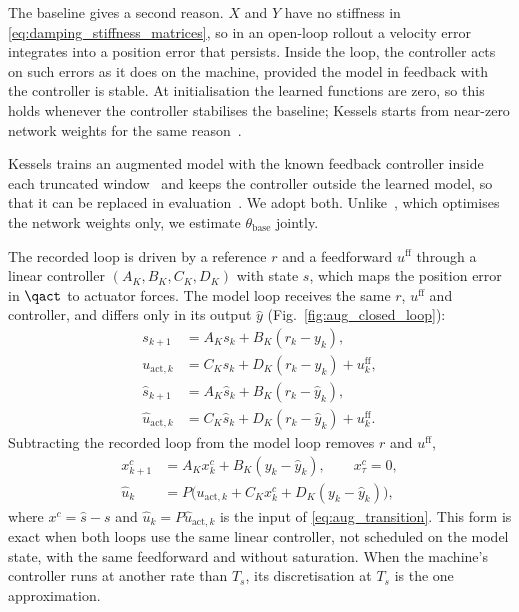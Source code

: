 The baseline gives a second reason.
$X$ and $Y$ have no stiffness in \eqref{eq:damping_stiffness_matrices}, so
in an open-loop rollout a velocity error integrates into a position error
that persists.
Inside the loop, the controller acts on such errors as it does on the
machine, provided the model in feedback with the controller is stable.
At initialisation the learned functions are zero, so this holds whenever
the controller stabilises the baseline; Kessels starts from near-zero
network weights for the same reason~\cite[Sec.~5.2.3]{kessels2025ai}.

Kessels trains an augmented model with the known feedback controller inside
each truncated window~\cite[Eqs.~(5.12), (5.13c), (5.13d)]{kessels2025ai}
and keeps the controller outside the learned model, so that it can be
replaced in evaluation~\cite[Sec.~5.3.2.3]{kessels2025ai}.
We adopt both.
Unlike~\cite[Eq.~(5.12)]{kessels2025ai}, which optimises the network
weights only, we estimate $\theta_{\mathrm{base}}$ jointly.

The recorded loop is driven by a reference $r$ and a feedforward
$u^{\mathrm{ff}}$ through a linear controller $(A_K,B_K,C_K,D_K)$ with
state $s$, which maps the position error in $\qact$ to actuator forces.
The model loop receives the same $r$, $u^{\mathrm{ff}}$ and controller, and
differs only in its output $\hat y$ (Fig.~\ref{fig:aug_closed_loop}):
\begin{equation}
\begin{aligned}
 s_{k+1}&=A_K s_k+B_K(r_k-y_k), \\
 u_{\mathrm{act},k}&=C_K s_k+D_K(r_k-y_k)+u^{\mathrm{ff}}_k,\\
 \hat s_{k+1}&=A_K \hat s_k+B_K(r_k-\hat y_k), \\
 \hat u_{\mathrm{act},k}&=C_K \hat s_k+D_K(r_k-\hat y_k)+u^{\mathrm{ff}}_k .
\end{aligned}
\label{eq:aug_direct_controller}
\end{equation}
Subtracting the recorded loop from the model loop removes $r$ and
$u^{\mathrm{ff}}$,
\begin{equation}
\begin{aligned}
 x^c_{k+1}&=A_K x^c_k+B_K(y_k-\hat y_k),\qquad x^c_\tau=0,\\
 \hat u_k&=P\bigl(u_{\mathrm{act},k}+C_K x^c_k+D_K(y_k-\hat y_k)\bigr),
\end{aligned}
\label{eq:aug_controller}
\end{equation}
where $x^c=\hat s-s$ and $\hat u_k=P\hat u_{\mathrm{act},k}$ is the input
of \eqref{eq:aug_transition}.
This form is exact when both loops use the same linear controller, not
scheduled on the model state, with the same feedforward and without
saturation.
When the machine's controller runs at another rate than $T_s$, its
discretisation at $T_s$ is the one approximation.

